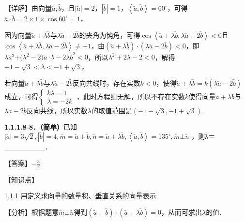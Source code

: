【⁠详⁠解⁠】由向量\(\overset{⃑}{a},\overset{⃑}{b}\)，且\(\left| \overset{⃑}{a} \right| = 2\)，\(\left| \overset{⃑}{b} \right| = 1\)，\(\left\langle \overset{⃑}{a},\overset{⃑}{b} \right\rangle = 60^{\circ}\)，可得\(\overset{⃑}{a} \cdot \overset{⃑}{b} = 2 \times 1 \times \cos 60^{\circ} = 1\)，

因为向量\(\overset{⃑}{a} + \lambda\overset{⃑}{b}\)与\(\lambda\overset{⃑}{a} - 2\overset{⃑}{b}\)的夹角为钝角，可得\(\cos\left\langle \overset{⃑}{a} + \lambda\overset{⃑}{b},\lambda\overset{⃑}{a} - 2\overset{⃑}{b} \right\rangle < 0\)且\(\cos\left\langle \overset{⃑}{a} + \lambda\overset{⃑}{b},\lambda\overset{⃑}{a} - 2\overset{⃑}{b} \right\rangle \neq - 1\)，由\(\left( \overset{⃑}{a} + \lambda\overset{⃑}{b} \right) \cdot \left( \lambda\overset{⃑}{a} - 2\overset{⃑}{b} \right) < 0\)，即\(\lambda{\overset{⃑}{a}}^{2}\text{+(}\lambda^{2} - 2)\overset{⃑}{a} \cdot \overset{⃑}{b} - 2\lambda{\overset{⃑}{b}}^{2} < 0\)，所以\(\lambda^{2} + 2\lambda - 2 < 0\)，解得\(- 1 - \sqrt{3} < \lambda < - 1 + \sqrt{3}\)，

若向量\(\overset{⃑}{a} + \lambda\overset{⃑}{b}\)与\(\lambda\overset{⃑}{a} - 2\overset{⃑}{b}\)反向共线时，存在实数\(k < 0\)，使得\(\overset{⃑}{a} + \lambda\overset{⃑}{b} = k(\lambda\overset{⃑}{a} - 2\overset{⃑}{b})\)成立，可得\(\left\{ \begin{array}{r}
k\lambda = 1 \\
\lambda = - 2k
\end{array} \right.\ \)，此时方程组无解，所以不存在实数\(k\)使得向量\(\overset{⃑}{a} + \lambda\overset{⃑}{b}\)与\(\lambda\overset{⃑}{a} - 2\overset{⃑}{b}\)反向共线，所以实数\(\lambda\)的取值范围是\(\left( - 1 - \sqrt{3}, - 1 + \sqrt{3} \right)\).

\textbf{1.1.1.8-8．（简单）}已知\(\left| \overset{⃑}{a} \right| = 3\sqrt{2},\left| \overset{⃑}{b} \right| = 4,\overset{⃑}{m} = \overset{⃑}{a} + \overset{⃑}{b},\overset{⃑}{n} = \overset{⃑}{a} + \lambda\overset{⃑}{b},\left\langle \overset{⃑}{a},\overset{⃑}{b} \right\rangle = 135{^\circ},\overset{⃑}{m}\bot\overset{⃑}{n}\)
，则λ＝\_\_\_\_\_\_\_\_．

【⁠答⁠案⁠】\(- \frac{3}{2}\)

【⁠知⁠识⁠点⁠】

1.1.1 用定义求向量的数量积、垂直关系的向量表示

【⁠分⁠析⁠】根据题意\(\overset{⃑}{m}\bot\overset{⃑}{n}\)得到\(\left( \overset{⃑}{a} + \overset{⃑}{b} \right) \cdot \left( \overset{⃑}{a} + \lambda\overset{⃑}{b} \right) = 0\)，从而可求出\(\lambda\)的值.

